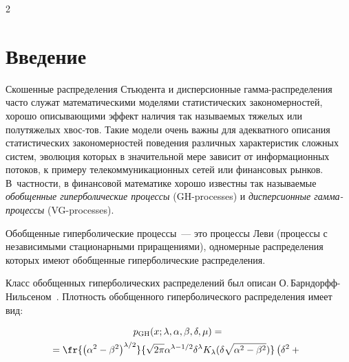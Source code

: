       \begin{multicols}{2}
      
            \label{st\stat}

\section{Введение}

Скошенные распределения Стьюдента и дисперсионные
гам\-ма-рас\-пре\-де\-ле\-ния часто служат математическими моделями
статистических закономерностей, хорошо описывающими эффект наличия\linebreak
так называемых тяжелых или полутяжелых хвос-\linebreak тов. Такие модели очень
важны для адекватного описания статистических закономерностей
поведения различных характеристик сложных сис\-тем, эволюция которых
в значительной мере зависит от информационных потоков, к примеру
телекоммуникационных сетей или финансовых рынков. В~част\-ности, в
финансовой математике хорошо известны так называемые 
\textit{обобщенные гиперболические процессы} (GH-processes) и \textit{дисперсионные 
гам\-ма-про\-цес\-сы} (VG-processes).

Обобщенные гиперболические процессы~--- это процессы Леви (процессы
с независимыми ста\-ци\-о\-нар\-ны\-ми приращениями), одномерные
распределения которых имеют обобщенные гиперболические
распределения. 

Класс обобщенных гиперболических распределений был
описан О.\,Барн\-дорфф-Ниль\-се\-ном~\cite{BarndorffNielsen1977}.
Плотность обобщенного гиперболического распределения имеет вид:

\noindent
\begin{multline*}
 p_{\mathrm{GH}}(x;\lambda,\alpha,\beta,\delta,\mu) ={}\\
 {}=
\fr{\left(\alpha^2-\beta^2\right)^{\lambda/2}}
{\sqrt{2\pi}\alpha^{\lambda-1/2}\delta^{\lambda}
  K_{\lambda}(\delta\sqrt{\alpha^2-\beta^2})}
 \left(\delta^2+{}\right.\hspace*{2mm}
 \end{multline*}
 

\end{multicols}
